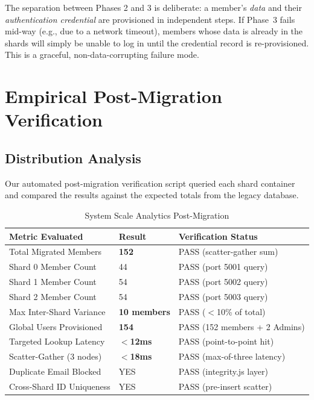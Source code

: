 \documentclass[sigconf]{acmart}
\newcommand{\theadbf}[1]{\textbf{#1}}
\begin{document}
\noindent The separation between Phases 2 and 3 is deliberate: a member's \textit{data} and their \textit{authentication credential} are provisioned in independent steps. If Phase~3 fails mid-way (e.g., due to a network timeout), members whose data is already in the shards will simply be unable to log in until the credential record is re-provisioned. This is a graceful, non-data-corrupting failure mode.

\section{Empirical Post-Migration Verification}

\subsection{Distribution Analysis}

Our automated post-migration verification script queried each shard container and compared the results against the expected totals from the legacy database.

\begin{table}[H]
\centering
\caption{System Scale Analytics Post-Migration}
\label{tab:migration-results}
\small
\renewcommand{\arraystretch}{1.3}
\begin{tabular}{|L{3.5cm}|L{1.5cm}|L{2cm}|}
\hline
{}\color{white}\theadbf{Metric Evaluated} & \color{white}\theadbf{Result} & \color{white}\theadbf{Verification Status} \\
\hline
{}Total Migrated Members & \textbf{152} & PASS (scatter-gather sum) \\
\hline
Shard 0 Member Count & 44 & PASS (port 5001 query) \\
\hline
{}Shard 1 Member Count & 54 & PASS (port 5002 query) \\
\hline
Shard 2 Member Count & 54 & PASS (port 5003 query) \\
\hline
{}Max Inter-Shard Variance & \textbf{10 members} & PASS ($<$10\% of total) \\
\hline
Global Users Provisioned & \textbf{154} & PASS (152 members + 2 Admins) \\
\hline
{}Targeted Lookup Latency & \textbf{$<$12ms} & PASS (point-to-point hit) \\
\hline
Scatter-Gather (3 nodes) & \textbf{$<$18ms} & PASS (max-of-three latency) \\
\hline
{}Duplicate Email Blocked & YES & PASS (integrity.js layer) \\
\hline
Cross-Shard ID Uniqueness & YES & PASS (pre-insert scatter) \\
\hline
\end{tabular}
\end{table}
\end{document}
